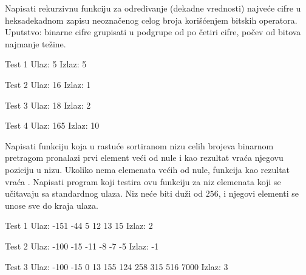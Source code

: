 \begin{Exercise}[label=309]
Napisati rekurzivnu funkciju za određivanje (dekadne vrednosti)
najveće cifre u heksadekadnom zapisu neoznačenog celog broja
korišćenjem bitskih operatora. Uputstvo: binarne cifre
grupisati u podgrupe od po četiri cifre, počev od bitova
najmanje težine.

\begin{minitest}
\begin{test}{Test 1}
Ulaz:  5
Izlaz: 5
\end{test}
\end{minitest}
\begin{minitest}
\begin{test}{Test 2}
Ulaz:  16
Izlaz: 1
\end{test}
\end{minitest}
\begin{minitest}
\begin{test}{Test 3}
Ulaz:  18
Izlaz: 2
\end{test}
\end{minitest}

\begin{minitest}
\begin{test}{Test 4}
Ulaz:  165
Izlaz: 10
\end{test}
\end{minitest}
\end{Exercise}
\begin{Answer}[ref=309]
\end{Answer}

\begin{Exercise}[label=310]
Napisati funkciju koja u rastuće sortiranom nizu celih brojeva
binarnom pretragom pronalazi prvi element veći od nule i kao
rezultat vraća njegovu poziciju u nizu. Ukoliko nema elemenata
većih od nule, funkcija kao rezultat vraća . Napisati
program koji testira ovu funkciju za niz elemenata koji se
učitavaju sa standardnog ulaza. Niz neće biti duži od
$256$, i njegovi elementi se unose sve do kraja ulaza.

\begin{minitest}
\begin{test}{Test 1}
Ulaz:  -151 -44 5 
       12 13 15
Izlaz: 2
\end{test}
\end{minitest}
\begin{minitest}
\begin{test}{Test 2}
Ulaz:  -100 -15 -11 
       -8 -7 -5
Izlaz: -1
\end{test}
\end{minitest}
\begin{minitest}
\begin{test}{Test 3}
Ulaz:  -100 -15 0 13 
       155 124 258 
       315 516 7000
Izlaz: 3
\end{test}
\end{minitest}
\end{Exercise}
\begin{Answer}[ref=310]
\end{Answer}

